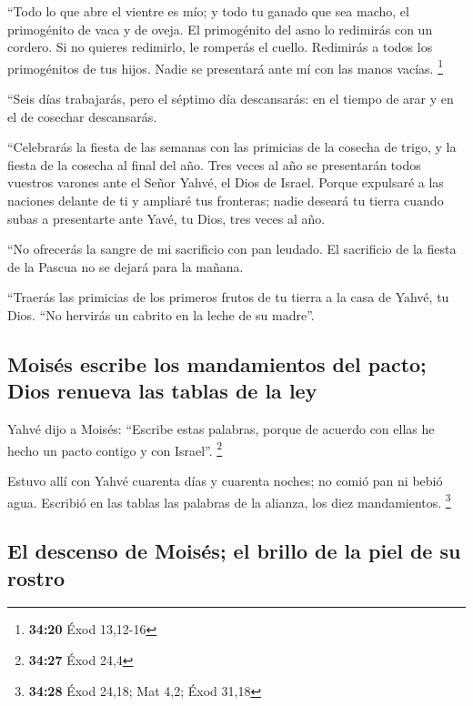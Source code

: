 \begin{paracol}{2}
 ``Todo lo que abre el vientre es mío; y todo tu ganado
que sea macho, el primogénito de vaca y de oveja.  El
primogénito del asno lo redimirás con un cordero. Si no quieres
redimirlo, le romperás el cuello. Redimirás a todos los primogénitos de
tus hijos. Nadie se presentará ante mí con las manos vacías. \footnote{\textbf{34:20}
  Éxod 13,12-16}

 ``Seis días trabajarás, pero el séptimo día descansarás:
en el tiempo de arar y en el de cosechar descansarás.

 ``Celebrarás la fiesta de las semanas con las primicias
de la cosecha de trigo, y la fiesta de la cosecha al final del año.
 Tres veces al año se presentarán todos vuestros varones
ante el Señor Yahvé, el Dios de Israel.  Porque expulsaré
a las naciones delante de ti y ampliaré tus fronteras; nadie deseará tu
tierra cuando subas a presentarte ante Yavé, tu Dios, tres veces al año.

 ``No ofrecerás la sangre de mi sacrificio con pan
leudado. El sacrificio de la fiesta de la Pascua no se dejará para la
mañana.

 ``Traerás las primicias de los primeros frutos de tu
tierra a la casa de Yahvé, tu Dios. ``No hervirás un cabrito en la leche
de su madre''.

\hypertarget{moisuxe9s-escribe-los-mandamientos-del-pacto-dios-renueva-las-tablas-de-la-ley}{%
\subsection{Moisés escribe los mandamientos del pacto; Dios renueva las
tablas de la
ley}\label{moisuxe9s-escribe-los-mandamientos-del-pacto-dios-renueva-las-tablas-de-la-ley}}

 Yahvé dijo a Moisés: ``Escribe estas palabras, porque de
acuerdo con ellas he hecho un pacto contigo y con Israel''. \footnote{\textbf{34:27}
  Éxod 24,4}

 Estuvo allí con Yahvé cuarenta días y cuarenta noches;
no comió pan ni bebió agua. Escribió en las tablas las palabras de la
alianza, los diez mandamientos. \footnote{\textbf{34:28} Éxod 24,18; Mat
  4,2; Éxod 31,18}

\hypertarget{el-descenso-de-moisuxe9s-el-brillo-de-la-piel-de-su-rostro}{%
\subsection{El descenso de Moisés; el brillo de la piel de su
rostro}\label{el-descenso-de-moisuxe9s-el-brillo-de-la-piel-de-su-rostro}}


\end{paracol}
